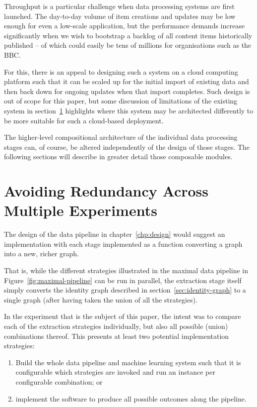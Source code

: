 Throughput is a particular challenge when data processing systems
are first launched. The day-to-day volume of item creations and
updates may be low enough for even a low-scale application, but the
performance demands increase significantly when we wish to bootstrap
a backlog of all content items historically published -- of which
could easily be tens of millions for organisations such as the BBC.

For this, there is an
appeal to designing such a system on a cloud computing platform such
that it can be scaled up for the initial import of existing data and
then back down for ongoing updates when that import completes. Such
design is out of scope for this paper, but some discussion of
limitations of the existing system in section~\ref{} highlights where
this system may be architected differently to be more suitable for
such a cloud-based deployment.

The higher-level compositional architecture of the individual
data processing stages can, of course, be altered independently of
the design of those stages. The following sections will describe in
greater detail those composable modules.

\section{Avoiding Redundancy Across Multiple Experiments}

The design of the data pipeline in chapter~\ref{chp:design} would
suggest an implementation with each stage implemented as a function
converting a graph into a new, richer graph.

That is, while the different strategies illustrated in the maximal
data pipeline in Figure~\ref{fig:maximal-pipeline} can be run in
parallel, the extraction stage itself simply converts the identity
graph described in section~\ref{sec:identity-graph} to a single graph
(after having taken the union of all the strategies).

In the experiment that is the subject of this paper, the intent was
to compare each of the extraction strategies individually, but also
all possible (union) combinations thereof. This presents at least
two potential implementation strategies:

\begin{enumerate}
\item Build the whole data pipeline and machine learning system such
  that it is configurable which strategies are invoked and run an
  instance per configurable combination; or
\item implement the software to produce all possible outcomes along
  the pipeline.
\end{enumerate}

